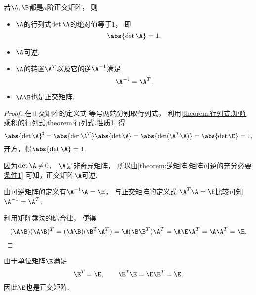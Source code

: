 \begin{property}
若\(\A,\B\)都是\(n\)阶正交矩阵，
则\begin{itemize}
	\item \(\A\)的行列式\(\det\A\)的绝对值等于\(1\)，
	即\begin{equation}\label{equation:正交矩阵.正交矩阵的行列式}
		\abs{\det\A}=1.
	\end{equation}

	\item \(\A\)可逆.

	\item \(\A\)的转置\(\A^T\)以及它的逆\(\A^{-1}\)满足
	\begin{equation}\label{equation:正交矩阵.正交矩阵的转置等于正交矩阵的逆}
		\A^{-1}=\A^T.
	\end{equation}

	\item \(\A\B\)也是正交矩阵.
\end{itemize}
\begin{proof}
在正交矩阵的定义式  等号两端分别取行列式，
利用\cref{theorem:行列式.矩阵乘积的行列式,theorem:行列式.性质1} 得\[
	\abs{\det\A}^2
	=\abs{\det\A^T} \abs{\det\A\vphantom{^T}}
	=\abs{\det(\A^T \A)}
	=\abs{\det\E}
	=1,
\]
开方，得\(\abs{\det\A}=1\).

因为\(\det\A\neq0\)，
\(\A\)是非奇异矩阵，
所以由\cref{theorem:逆矩阵.矩阵可逆的充分必要条件1} 可知，正交矩阵\(\A\)可逆.

由\hyperref[definition:可逆矩阵.可逆矩阵的定义]{可逆矩阵的定义}有\(\A^{-1}\A=\E\)，
与\hyperref[equation:正交矩阵.正交矩阵的定义式]{正交矩阵的定义式}
\(\A^T\A=\E\)比较可知\(\A^{-1}=\A^T\).

利用矩阵乘法的结合律，
便得\[
	(\A\B)(\A\B)^T
	= (\A\B)(\B^T\A^T)
	= \A(\B\B^T)\A^T
	= \A\E\A^T
	= \A\A^T
	= \E.
	\qedhere
\]
\end{proof}
\end{property}

\begin{example}
由于单位矩阵\(\E\)满足\[
	\E^T=\E, \qquad
	\E^T \E = \E \E^T = \E,
\]
因此\(\E\)也是正交矩阵.
\end{example}

